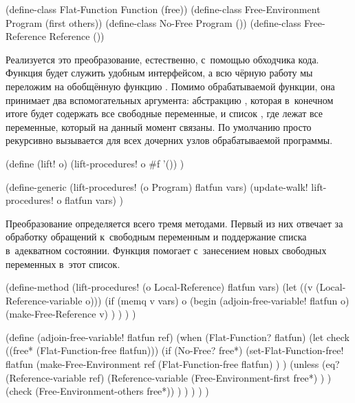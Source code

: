 
\begin{code:lisp}
(define-class Flat-Function    Function  (free))
(define-class Free-Environment Program   (first others))
(define-class No-Free          Program   ())
(define-class Free-Reference   Reference ())
\end{code:lisp}

Реализуется это преобразование, естественно, с~помощью обходчика кода. Функция
 будет служить удобным интерфейсом, а всю чёрную работу мы переложим
на обобщённую функцию . Помимо обрабатываемой функции, она
принимает два вспомогательных аргумента: абстракцию , которая
в~конечном итоге будет содержать все свободные переменные, и список ,
где лежат все переменные, который на данный момент связаны. По умолчанию
 просто рекурсивно вызывается для всех дочерних узлов
обрабатываемой программы.

\begin{code:lisp}
(define (lift! o)
  (lift-procedures! o #f '()) )

(define-generic (lift-procedures! (o Program) flatfun vars)
  (update-walk! lift-procedures! o flatfun vars) )
\end{code:lisp}


Преобразование определяется всего тремя методами. Первый из них отвечает за
обработку обращений к~свободным переменным и поддержание списка 
в~адекватном состоянии. Функция  помогает с~занесением
новых свободных переменных в~этот список.

\begin{code:lisp}
(define-method (lift-procedures! (o Local-Reference) flatfun vars)
  (let ((v (Local-Reference-variable o)))
    (if (memq v vars) o
        (begin (adjoin-free-variable! flatfun o)
               (make-Free-Reference v) ) ) ) )

(define (adjoin-free-variable! flatfun ref)
  (when (Flat-Function? flatfun)
    (let check ((free* (Flat-Function-free flatfun)))
      (if (No-Free? free*)
          (set-Flat-Function-free!
           flatfun (make-Free-Environment
                    ref (Flat-Function-free flatfun) ) )
          (unless (eq? (Reference-variable ref)
                       (Reference-variable
                        (Free-Environment-first free*) ) )
            (check (Free-Environment-others free*)) ) ) ) ) )
\end{code:lisp}

